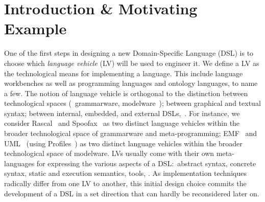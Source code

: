 \section{Introduction \& Motivating Example}
One of the first steps in designing a new Domain-Specific Language (DSL) is to choose which \emph{language vehicle} (LV) will be used to engineer it.
We define a LV as the technological means for implementing a language.
This include language workbenches as well as programming languages and ontology languages, to name a few.
The notion of language vehicle is orthogonal to the distinction between technological spaces (\eg~grammarware, modelware~\cite{kurtev2002technological}); between graphical and textual syntax; between internal, embedded, and external DSLs,~\etc.
For instance, we consider Rascal~\cite{klint2010easy} and Spoofax~\cite{kats2010spoofax} as two distinct language vehicles within the broader technological space of grammarware and meta-programming; EMF~\cite{steinberg2008emf} and UML~\cite{fowler2004uml} (using Profiles~\cite{selic2007systematic}) as two distinct language vehicles within the broader technological space of modelware.
LVs usually come with their own meta-languages for expressing the various aspects of a DSL:~abstract syntax, concrete syntax, static and execution semantics, tools, \etc.
As implementation techniques radically differ from one LV to another, this initial design choice commits the development of a DSL in a set direction that can hardly be reconsidered later on.

